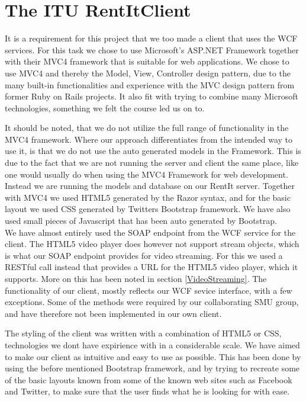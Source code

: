 \section{The ITU RentItClient}
It is a requirement for this project that we too made a client that uses the WCF services. 
For this task we chose to use Microsoft's ASP.NET Framework together with their MVC4 framework
that is suitable for web applications. We chose to use MVC4 and thereby the Model, View, Controller
design pattern, due to the many built-in functionalities and experience with the MVC design pattern from former 
Ruby on Rails projects. It also fit with trying to combine many Microsoft technologies, something we felt the course led us on to.

It should be noted, that we do not utilize the full range of functionality in the MVC4 framework.
Where our approach differentiates from the intended way to use it, is that we do not use the auto
generated models in the Framework. This is due to the fact that we are not running the server and
client the same place, like one would usually do when using the MVC4 Framework for web development.
Instead we are running the models and database on our RentIt server. Together with MVC4 we used HTML5
generated by the Razor syntax, and for the basic layout we used CSS generated by 
Twitters Bootstrap framework. We have also used small pieces of Javascript that has been auto generated by Bootstrap. \\

We have almost entirely used the SOAP endpoint from the WCF service for the client. The HTML5  video player does however not support stream objects, which is what our SOAP endpoint provides
for video streaming. For this we used a RESTful call instead that provides a
URL for the HTML5 video player, which it supports. More on this has been noted in section \ref{VideoStreaming}. The functionality of our client, mostly reflects our WCF sevice interface, with a few exceptions. Some of the methods were required by our collaborating SMU group, and have therefore not been implemented in our own client.

The styling of the client was written with a combination of HTML5 or CSS, technologies we dont have expirience with in a considerable scale. We have aimed to make our client as intuitive and easy to use as possible. This has been done
by using the before mentioned Bootstrap framework, and by trying to recreate some of the basic
layouts known from some of the known web sites such as Facebook and Twitter, to make sure
that the user finds what he is looking for with ease.



